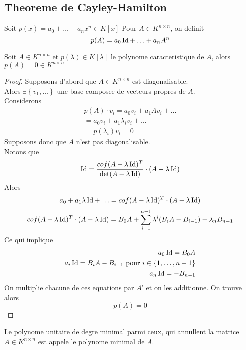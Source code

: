 \documentclass[../main.tex]{subfiles}
\begin{document}
\subsection{Theoreme de Cayley-Hamilton}

\begin{thm}
	Soit $p( x) = a_0 + \ldots + a_n x^{n} \in K[x]$
	Pour $A \in K^{n\times n}$, on definit
	\[ 
		p( A) = a_0 \operatorname*{Id} + \ldots  + a_n A^{n}
	\]
\end{thm}
\begin{thm}
	Soit $A \in K^{n\times n}$ et $p(\lambda ) \in K[\lambda]$
	le polynome caracteristique de $A$, alors $p( A) =0 \in K^{n\times n}$
\end{thm}
\begin{proof}
Supposons d'abord que $A \in K^{n\times n}$ est diagonalisable.\\
Alors $\exists  \left\{ v_1,\ldots \right\} $ une base composee de vecteurs propres de $A$.\\
Considerons
\begin{align*}
p( A) \cdot v_i = a_0 v_i + a_1 A  v_i + \ldots\\
= a_0 v_i + a_1 \lambda_i v_i + \ldots \\
= p( \lambda_i) v_i
= 0
\end{align*}
Supposons donc que $A$ n'est pas diagonalisable.\\
Notons que
\[ 
	\operatorname*{Id} = \frac{cof( A - \lambda \operatorname*{Id})^{T}}{\det( A-\lambda \operatorname*{Id}) } \cdot ( A - \lambda \operatorname*{Id}) 
\]
Alors
\[ 
	a_0 + a_1 \lambda \operatorname*{Id} + \ldots = cof( A-\lambda \operatorname*{Id}) ^{T}\cdot ( A- \lambda \operatorname*{Id}) 
\]
\begin{align*}
	cof( A-\lambda \operatorname*{Id}) ^{T}\cdot ( A- \lambda \operatorname*{Id}) = B_0 A + \sum_{i=1}^{ n-1}\lambda^{i}( B_iA - B_{i-1} ) -\lambda_n B_{n-1} 
\end{align*}
Ce qui implique
\begin{align*}
a_0 \operatorname*{Id} = B_0 A\\
a_i \operatorname*{Id} = B_i A - B_{i-1} \text{ pour  } i \in \left\{ 1, \ldots, n-1 \right\} \\
a_n \operatorname*{Id} = -B_{n-1} 
\end{align*}
On multiplie chacune de ces equations par $A^{i}$ et on les additionne.
On trouve alors
\[ 
	p( A) = 0
\]

\end{proof}
\begin{defn}
	Le polynome unitaire de degre minimal parmi ceux, qui annullent la matrice  $A \in K^{n\times n}$ est appele le polynome minimal de $A$.
\end{defn}
\end{document}
